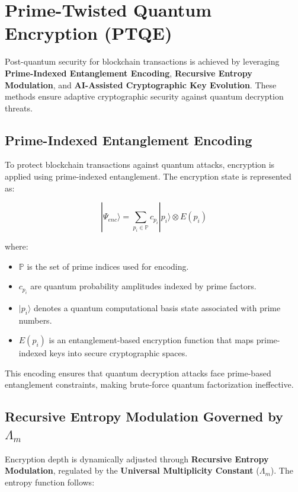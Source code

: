 \documentclass{article}
\theoremstyle{plain}
\begin{document}
\section{Prime-Twisted Quantum Encryption (PTQE)}

Post-quantum security for blockchain transactions is achieved by leveraging \textbf{Prime-Indexed Entanglement Encoding}, \textbf{Recursive Entropy Modulation}, and \textbf{AI-Assisted Cryptographic Key Evolution}. These methods ensure adaptive cryptographic security against quantum decryption threats.

\subsection{Prime-Indexed Entanglement Encoding}

To protect blockchain transactions against quantum attacks, encryption is applied using prime-indexed entanglement. The encryption state is represented as:

\begin{equation}
    |\Psi_{enc}\rangle = \sum_{p_i \in \mathbb{P}} c_{p_i} |p_i\rangle \otimes E(p_i)
\end{equation}

where:
\begin{itemize}
    \item $\mathbb{P}$ is the set of prime indices used for encoding.
    \item $c_{p_i}$ are quantum probability amplitudes indexed by prime factors.
    \item $|p_i\rangle$ denotes a quantum computational basis state associated with prime numbers.
    \item $E(p_i)$ is an entanglement-based encryption function that maps prime-indexed keys into secure cryptographic spaces.
\end{itemize}

This encoding ensures that quantum decryption attacks face prime-based entanglement constraints, making brute-force quantum factorization ineffective.

\subsection{Recursive Entropy Modulation Governed by $\Lambda_m$}

Encryption depth is dynamically adjusted through \textbf{Recursive Entropy Modulation}, regulated by the \textbf{Universal Multiplicity Constant} ($\Lambda_m$). The entropy function follows:
\end{document}
